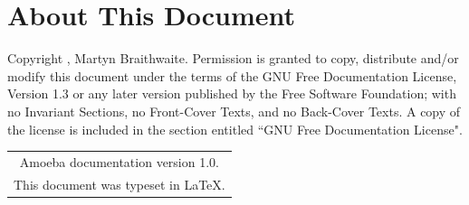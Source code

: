\documentclass[11pt]{article}
\begin{document}
\section{About This Document}
\thispagestyle{empty}
\noindent
\newline
\newline
\newline
\newline
\newline
\newline
\newline
\newline
\newline
\newline
\newline
\newline
\newline
\newline
\newline
\newline
\newline
Copyright , Martyn Braithwaite.
\newline
\newline
Permission is granted to copy, distribute and/or modify this document under the terms of the GNU Free Documentation License, Version 1.3 or any later version published by the Free Software Foundation; with no Invariant Sections, no Front-Cover Texts, and no Back-Cover Texts. A copy of the license is included in the section entitled ``GNU Free Documentation License".
\newline
\newline
\newline
\newline
\newline
\newline
\begin{center}
\begin{tabular}{c}
Amoeba documentation version 1.0. \\
This document was typeset in \LaTeX. \\
\end{tabular}
\end{center}
\newpage
\noindent
\end{document}
